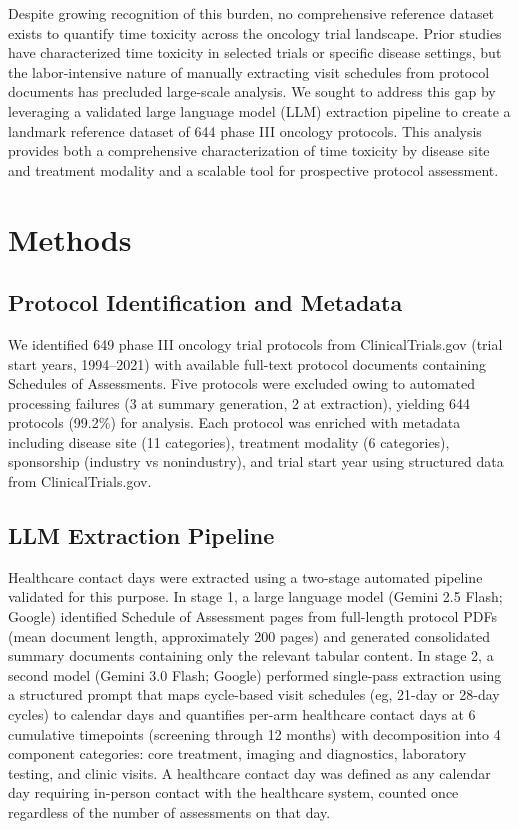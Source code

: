 \documentclass[12pt]{article}
\begin{document}
Despite growing recognition of this burden, no comprehensive reference dataset exists to quantify time toxicity across the oncology trial landscape. Prior studies have characterized time toxicity in selected trials or specific disease settings,\cite{gupta2024a,gupta2024b} but the labor-intensive nature of manually extracting visit schedules from protocol documents has precluded large-scale analysis. We sought to address this gap by leveraging a validated large language model (LLM) extraction pipeline to create a landmark reference dataset of 644 phase III oncology protocols. This analysis provides both a comprehensive characterization of time toxicity by disease site and treatment modality and a scalable tool for prospective protocol assessment.

\section*{Methods}

\subsection*{Protocol Identification and Metadata}

We identified 649 phase III oncology trial protocols from ClinicalTrials.gov (trial start years, 1994--2021) with available full-text protocol documents containing Schedules of Assessments. Five protocols were excluded owing to automated processing failures (3 at summary generation, 2 at extraction), yielding 644 protocols (99.2\%) for analysis. Each protocol was enriched with metadata including disease site (11 categories), treatment modality (6 categories), sponsorship (industry vs nonindustry), and trial start year using structured data from ClinicalTrials.gov.\cite{ctgov}

\subsection*{LLM Extraction Pipeline}

Healthcare contact days were extracted using a two-stage automated pipeline validated for this purpose.\cite{companion} In stage 1, a large language model (Gemini 2.5 Flash; Google) identified Schedule of Assessment pages from full-length protocol PDFs (mean document length, approximately 200 pages) and generated consolidated summary documents containing only the relevant tabular content. In stage 2, a second model (Gemini 3.0 Flash; Google) performed single-pass extraction using a structured prompt that maps cycle-based visit schedules (eg, 21-day or 28-day cycles) to calendar days and quantifies per-arm healthcare contact days at 6 cumulative timepoints (screening through 12 months) with decomposition into 4 component categories: core treatment, imaging and diagnostics, laboratory testing, and clinic visits. A healthcare contact day was defined as any calendar day requiring in-person contact with the healthcare system, counted once regardless of the number of assessments on that day.
\end{document}
